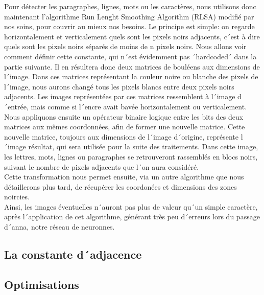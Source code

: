 Pour détecter les paragraphes, lignes, mots ou les caractères, nous utilisons donc maintenant l'algorithme Run Lenght Smoothing Algorithm (RLSA) modifié par nos soins, pour couvrir au mieux nos besoins. Le principe est simple: on regarde horizontalement et verticalement quels sont les pixels noirs adjacents, c´est à dire quels sont les pixels noirs séparés de moins de n pixels noirs. Nous allons voir comment définir cette constante, qui n´est évidemment pas ´hardcoded´ dans la partie suivante. Il en résultera donc deux matrices de bouléens aux dimensions de l´image. Dans ces matrices représentant la couleur noire ou blanche des pixels de l´image, nous aurons changé tous les pixels blancs entre deux pixels noirs adjacents. Les images représentées par ces matrices ressemblent à l´image d´entrée, mais comme si l´encre avait bavée horizontalement ou verticalement.\\
Nous appliquons ensuite un opérateur binaire logique entre les bits des deux matrices aux mêmes coordonnées, afin de former une nouvelle matrice. Cette nouvelle matrice, toujours aux dimensions de l´image d´origine, représente l´image résultat, qui sera utilisée pour la suite des traitements. Dans cette image, les lettres, mots, lignes ou paragraphes se retrouveront rassemblés en blocs noirs, suivant le nombre de pixels adjacents que l´on aura considéré.\\
Cette transformation nous permet ensuite, via un autre algorithme que nous détaillerons plus tard, de récupérer les coordonées et dimensions des zones noircies.\\
Ainsi, les images éventuelles n´auront pas plus de valeur qu´un simple caractère, après l´application de cet algorithme, générant très peu d´erreurs lors du passage d´anna, notre réseau de neuronnes.


\subsection{La constante d´adjacence}


\subsection{Optimisations}

